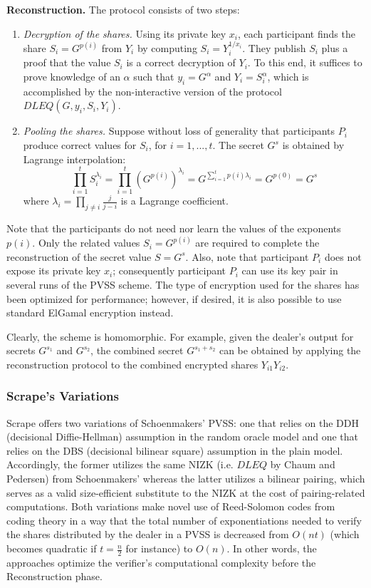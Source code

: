 \documentclass[11pt]{article}
\theoremstyle{definition}
\theoremstyle{remark}
\begin{document}
\textbf{Reconstruction.} The protocol consists of two steps:
\begin{enumerate}
\item \textit{Decryption of the shares.} Using its private key $x_i$, each participant finds the share $S_i = G^{p(i)}$ from $Y_i$ by computing $S_i = Y_i^{1 / x_i}$. They publish $S_i$ plus a proof that the value $S_i$ is a correct decryption of $Y_i$. To this end, it suffices to prove knowledge of an $\alpha$ such that $y_i = G^\alpha$ and $Y_i = S_i^\alpha$, which is accomplished by the non-interactive version of the protocol $DLEQ(G, y_i, S_i, Y_i)$.
\item \textit{Pooling the shares.} Suppose without loss of generality that participants $P_i$ produce correct values for $S_i$, for $i = 1, ..., t$. The secret $G^s$ is obtained by Lagrange interpolation:
$$\prod_{i = 1}^{t} S_i^{\lambda_i} = \prod_{i = 1}^{t} \left(G^{p(i)}\right)^{\lambda_i} = G^{\sum_{i = 1}^{t} p(i) \lambda_i} = G^{p(0)} = G^s$$
where $\lambda_i = \prod_{j \neq i} \frac{j}{j - i}$ is a Lagrange coefficient.
\end{enumerate}

Note that the participants do not need nor learn the values of the exponents $p(i)$. Only the related values $S_i = G^{p(i)}$ are required to complete the reconstruction of the secret value $S = G^s$. Also, note that participant $P_i$ does not expose its private key $x_i$; consequently participant $P_i$ can use its key pair in several runs of the PVSS scheme. The type of encryption used for the shares has been optimized for performance; however, if desired, it is also possible to use standard ElGamal encryption instead. 

Clearly, the scheme is homomorphic. For example, given the dealer’s output for secrets $G^{s_1}$ and $G^{s_2}$, the combined secret $G^{s_1 + s_2}$ can be obtained by applying the reconstruction protocol to the combined encrypted shares $Y_{i1} Y_{i2}$.

\subsubsection{Scrape's Variations}
Scrape offers two variations of Schoenmakers' PVSS: one that relies on the DDH (decisional Diffie-Hellman) assumption in the random oracle model and one that relies on the DBS (decisional bilinear square) assumption in the plain model. Accordingly, the former utilizes the same NIZK (i.e. $DLEQ$ by Chaum and Pedersen) from Schoenmakers' whereas the latter utilizes a bilinear pairing, which serves as a valid size-efficient substitute to the NIZK at the cost of pairing-related computations. Both variations make novel use of Reed-Solomon codes from coding theory in a way that the total number of exponentiations needed to verify the shares distributed by the dealer in a PVSS is decreased from $O(n t)$ (which becomes quadratic if $t = \frac{n}{2}$ for instance) to $O(n)$. In other words, the approaches optimize the verifier's computational complexity before the Reconstruction phase.
\end{document}
